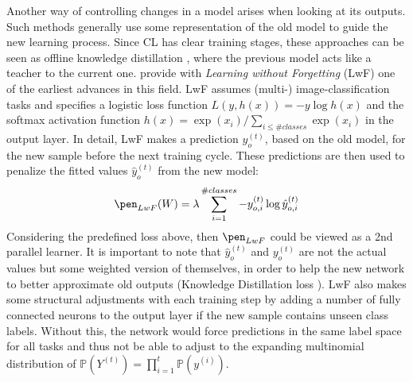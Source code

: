 Another way of controlling changes in a model arises when looking at its outputs. Such methods generally use some representation of the old model to guide the new learning process. Since CL has clear training stages, these approaches can be seen as offline knowledge distillation \cite{Gou_2021}, where the previous model acts like a teacher to the current one.
\citeauthor{li2017learningforgetting} \cite{li2017learningforgetting} provide with \textit{Learning without Forgetting} (LwF) one of the earliest advances in this field. LwF assumes (multi-) image-classification tasks and specifies a logistic loss function $L(y, h(x)) = -y \log h(x)$ and the softmax activation function $h(x) = \exp(x_i)/\sum_{i\leq \#classes}\exp(x_i)$ in the output layer. In detail, LwF makes a prediction $y_o^{(t)}$, based on the old model, for the new sample before the next training cycle. These predictions are then used to penalize the fitted values $\hat{y}_o^{(t)}$ from the new model:
\begin{equation}\label{LwF}
	\pen_{LwF}(W) = \lambda \sum_{i = 1}^{\#classes}-y_{o,i}^{(t)} \log \hat{y}_{o,i}^{(t)}
\end{equation}
Considering the predefined loss above, then $\pen_{LwF}$ could be viewed as a 2nd parallel learner. It is important to note that $\hat{y}_o^{(t)}$ and $y_o^{(t)}$ are not the actual values but some weighted version of themselves, in order to help the new network to better approximate old outputs (Knowledge Distillation loss \cite{hinton2015distillingknowledgeneuralnetwork}). LwF also makes some structural adjustments with each training step by adding a number of fully connected neurons to the output layer if the new sample contains unseen class labels. Without this, the network would force predictions in the same label space for all tasks and thus not be able to adjust to the expanding multinomial distribution of $\mathbb{P}(Y^{(t)}) = \prod_{i = 1}^{t}\mathbb{P}(y^{(i)})$.

